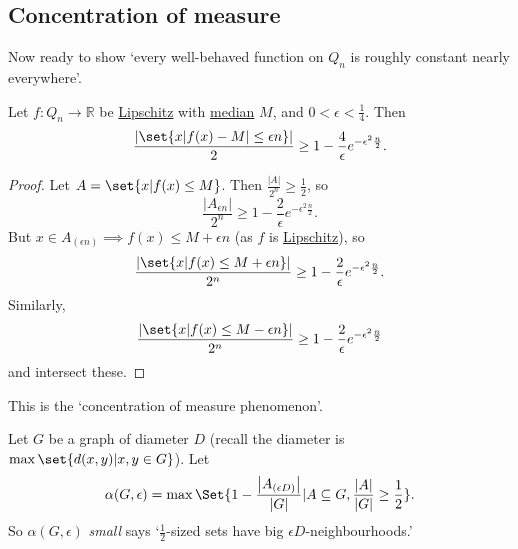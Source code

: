 \documentclass{article}
\newcommand{\named}[1]{\textbf{#1}\index{#1}}
\let\subset\subseteq
\begin{document}
\subsection{Concentration of measure}

Now ready to show `every well-behaved function on $Q_n$ is roughly constant nearly everywhere'.

\begin{nthm}\label{thm:2.6}
  Let $f: Q_n \to \mathbb{R}$ be \hyperlink{def:lips}{Lipschitz} with \hyperlink{def:median}{median} $M$, and $0 < \epsilon < \frac{1}{4}$.
  Then
  \begin{equation*}
    \frac{|\set{x | f(x) - M| \leq \epsilon n}|}{2} \geq 1 - \frac{4}{\epsilon} e^{-\epsilon^2 \frac{n}{2}}.
  \end{equation*}
\end{nthm}
\begin{proof}
  Let $A = \set{x | f(x) \leq M}$.
  Then $\frac{|A|}{2^n} \geq \frac{1}{2}$,
  so
  \begin{equation*}
    \frac{|A_{\epsilon n}|}{2^n} \geq 1 - \frac{2}{\epsilon} e^{-\epsilon^2 \frac{n}{2}}.
  \end{equation*}
  But $x \in A_{(\epsilon n)} \implies f(x) \leq M + \epsilon n$ (as $f$ is \hyperlink{def:lips}{Lipschitz}), so
  \begin{equation*}
    \frac{|\set{x | f(x) \leq M + \epsilon n}|}{2^n} \geq 1 - \frac{2}{\epsilon} e^{-\epsilon^2 \frac{n}{2}}.
  \end{equation*}
  Similarly,
  \begin{equation*}
    \frac{|\set{x | f(x) \leq M - \epsilon n}|}{2^n} \geq 1 - \frac{2}{\epsilon} e^{-\epsilon^2 \frac{n}{2}}
  \end{equation*}
  and intersect these.
\end{proof}

\begin{remark}
  This is the `concentration of measure phenomenon'.
\end{remark}
Let $G$ be a graph of diameter $D$ (recall the diameter is $\max\set{d(x,y) | x, y \in G}$).
Let
\begin{equation*}
  \alpha(G,\epsilon) = \max\Set{1 - \frac{\left\lvert A_{(\epsilon D)}\right\rvert}{\left\lvert G \right\rvert} | A \subset G, \frac{|A|}{|G|} \geq \frac{1}{2}}.
\end{equation*}
So $\alpha(G,\epsilon)$ \emph{small} says `$\frac{1}{2}$-sized sets have big $\epsilon D$-neighbourhoods.'
\end{document}
